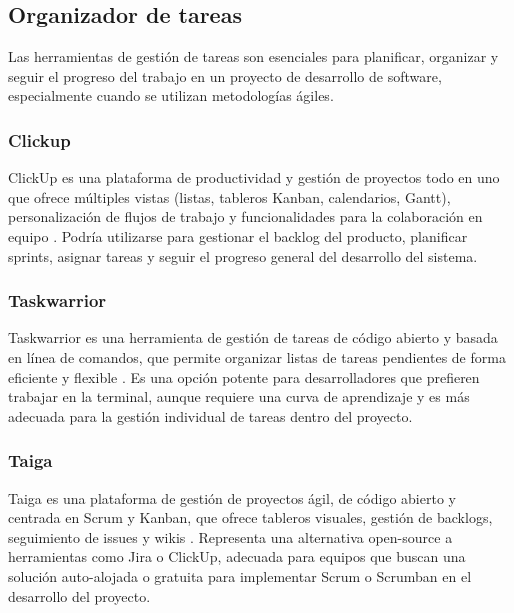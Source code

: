 \subsection{Organizador de tareas}
Las herramientas de gestión de tareas son esenciales para planificar, organizar y seguir el progreso del trabajo en un proyecto de desarrollo de software, especialmente cuando se utilizan metodologías ágiles.

\subsubsection{Clickup}
ClickUp es una plataforma de productividad y gestión de proyectos todo en uno que ofrece múltiples vistas (listas, tableros Kanban, calendarios, Gantt), personalización de flujos de trabajo y funcionalidades para la colaboración en equipo \parencite{ClickUp}.
Podría utilizarse para gestionar el backlog del producto, planificar sprints, asignar tareas y seguir el progreso general del desarrollo del sistema.

\subsubsection{Taskwarrior}
Taskwarrior es una herramienta de gestión de tareas de código abierto y basada en línea de comandos, que permite organizar listas de tareas pendientes de forma eficiente y flexible \parencite{Taskwarrior}.
Es una opción potente para desarrolladores que prefieren trabajar en la terminal, aunque requiere una curva de aprendizaje y es más adecuada para la gestión individual de tareas dentro del proyecto.

\subsubsection{Taiga}
Taiga es una plataforma de gestión de proyectos ágil, de código abierto y centrada en Scrum y Kanban, que ofrece tableros visuales, gestión de backlogs, seguimiento de issues y wikis \parencite{Taiga}.
Representa una alternativa open-source a herramientas como Jira o ClickUp, adecuada para equipos que buscan una solución auto-alojada o gratuita para implementar Scrum o Scrumban en el desarrollo del proyecto.
